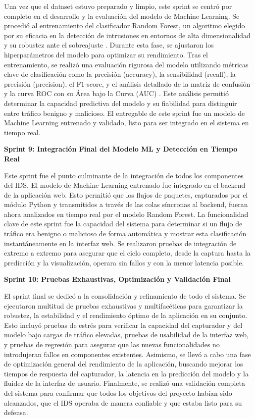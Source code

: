 Una vez que el dataset estuvo preparado y limpio, este sprint se centró por completo en el desarrollo y la evaluación del modelo de Machine Learning. Se procedió al entrenamiento del clasificador Random Forest, un algoritmo elegido por su eficacia en la detección de intrusiones en entornos de alta dimensionalidad y su robustez ante el sobreajuste \cite{Breiman2001RandomForests}. Durante esta fase, se ajustaron los hiperparámetros del modelo para optimizar su rendimiento. Tras el entrenamiento, se realizó una evaluación rigurosa del modelo utilizando métricas clave de clasificación como la precisión (accuracy), la sensibilidad (recall), la precisión (precision), el F1-score, y el análisis detallado de la matriz de confusión y la curva ROC con su Área bajo la Curva (AUC) \cite{PolaniaArias2021EvaluacionMLIDS}. Este análisis permitió determinar la capacidad predictiva del modelo y su fiabilidad para distinguir entre tráfico benigno y malicioso. El entregable de este sprint fue un modelo de Machine Learning entrenado y validado, listo para ser integrado en el sistema en tiempo real.

\textbf{Sprint 9: Integración Final del Modelo ML y Detección en Tiempo Real}

Este sprint fue el punto culminante de la integración de todos los componentes del IDS. El modelo de Machine Learning entrenado fue integrado en el backend de la aplicación web. Esto permitió que los flujos de paquetes, capturados por el módulo Python y transmitidos a través de las colas síncronas al backend, fueran ahora analizados en tiempo real por el modelo Random Forest. La funcionalidad clave de este sprint fue la capacidad del sistema para determinar si un flujo de tráfico era benigno o malicioso de forma automática y mostrar esta clasificación instantáneamente en la interfaz web. Se realizaron pruebas de integración de extremo a extremo para asegurar que el ciclo completo, desde la captura hasta la predicción y la visualización, operara sin fallos y con la menor latencia posible.

\textbf{Sprint 10: Pruebas Exhaustivas, Optimización y Validación Final}

El sprint final se dedicó a la consolidación y refinamiento de todo el sistema. Se ejecutaron multitud de pruebas exhaustivas y multifacéticas para garantizar la robustez, la estabilidad y el rendimiento óptimo de la aplicación en su conjunto. Esto incluyó pruebas de estrés para verificar la capacidad del capturador y del modelo bajo cargas de tráfico elevadas, pruebas de usabilidad de la interfaz web, y pruebas de regresión para asegurar que las nuevas funcionalidades no introdujeran fallos en componentes existentes. Asimismo, se llevó a cabo una fase de optimización general del rendimiento de la aplicación, buscando mejorar los tiempos de respuesta del capturador, la latencia en la predicción del modelo y la fluidez de la interfaz de usuario. Finalmente, se realizó una validación completa del sistema \cite{NIST2020SP800-115} para confirmar que todos los objetivos del proyecto habían sido alcanzados, que el IDS operaba de manera confiable y que estaba listo para su defensa.

